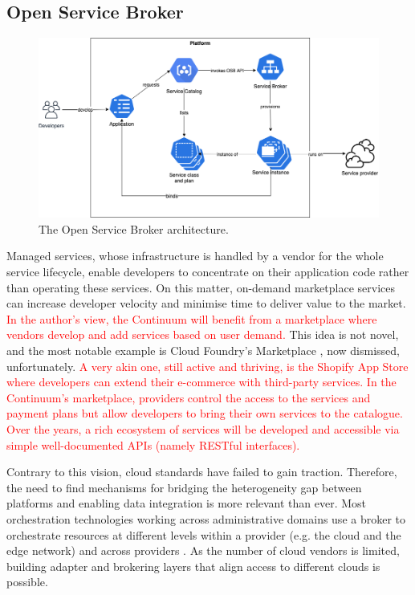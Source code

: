 \subsection{Open Service Broker}
\label{sec:osb}

\begin{figure}[ht]
\centering
\includegraphics[width=\columnwidth]{figures/osb}
\caption{The Open Service Broker architecture.} \label{fig:osb}
\end{figure}

Managed services, whose infrastructure is handled by a vendor for the whole service lifecycle, enable developers to concentrate on their application code rather than operating these services. On this matter, on-demand marketplace services can increase developer velocity and minimise time to deliver value to the market. \textcolor{red}{In the author's view, the Continuum will benefit from a marketplace where vendors develop and add services based on user demand.} This idea is not novel, and the most notable example is Cloud Foundry's Marketplace \cite{cloud-foundry-marketplace}, now dismissed, unfortunately. \textcolor{red}{A very akin one, still active and thriving, is the Shopify App Store \cite{shopify} where developers can extend their e-commerce with third-party services. In the Continuum's marketplace, providers control the access to the services and payment plans but allow developers to bring their own services to the catalogue. Over the years, a rich ecosystem of services will be developed and accessible via simple well-documented APIs (namely RESTful interfaces).}

Contrary to this vision, cloud standards have failed to gain traction. Therefore, the need to find mechanisms for bridging the heterogeneity gap between platforms and enabling data integration is more relevant than ever. Most orchestration technologies working across administrative domains use a broker to orchestrate resources at different levels within a provider (e.g. the cloud and the edge network) and across providers \cite{grozev2014inter}. As the number of cloud vendors is limited, building adapter and brokering layers that align access to different clouds is possible. 


